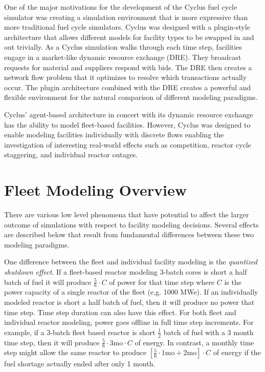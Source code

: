 \documentclass{style}
\begin{document}
One of the major motivations for the development of the Cyclus fuel cycle
simulator was creating a simulation environment that is more expressive than
more traditional fuel cycle simulators.  Cyclus was designed with a
plugin-style architecture that allows different models for facility types to
be swapped in and out trivially.  As a Cyclus simulation walks through each
time step, facilities engage in a market-like dynamic resource exchange (DRE).
They broadcast requests for material and suppliers respond with bids. The DRE
then creates a network flow problem that it optimizes to resolve which
transactions actually occur.  The plugin architecture combined with the DRE
creates a powerful and flexible environment for the natural comparison of
different modeling paradigms.

Cyclus' agent-based architecture in concert with its dynamic resource exchange
has the ability to model fleet-based facilities.  However, Cyclus was designed
to enable modeling facilities individually with discrete flows enabling the
investigation of interesting real-world effects such as competition, reactor
cycle staggering, and individual reactor outages.  

\section{Fleet Modeling Overview}

There are various low level phenomena that have potential to affect the larger
outcome of simulations with respect to facility modeling decisions. Several
effects are described below that result from fundamental differences between
these two modeling paradigms.

One difference between the fleet and individual facility modeling is the
\emph{quantized shutdown effect}.  If a fleet-based reactor modeling 3-batch
cores is short a half batch of fuel it will produce $\frac{5}{6}\cdot C$ of
power for that time step where $C$ is the power capacity of a single reactor
of the fleet (e.g. 1000 MWe).  If an individually modeled reactor is short a
half batch of fuel, then it will produce no power that time step.  Time step
duration can also have this effect.  For both fleet and individual reactor
modeling, power goes offline in full time step increments.  For example, if a
3-batch fleet based reactor is short $\frac{1}{2}$ batch of fuel with a 3
month time step, then it will produce $\frac{5}{6} \cdot 3 \text{mo} \cdot C $
of energy.  In contrast, a monthly time step might allow the same reactor to
produce $[\frac{5}{6} \cdot 1 \text{mo} + 2 \text{mo}] \cdot C $ of energy if
the fuel shortage actually ended after only 1 month.
\end{document}
